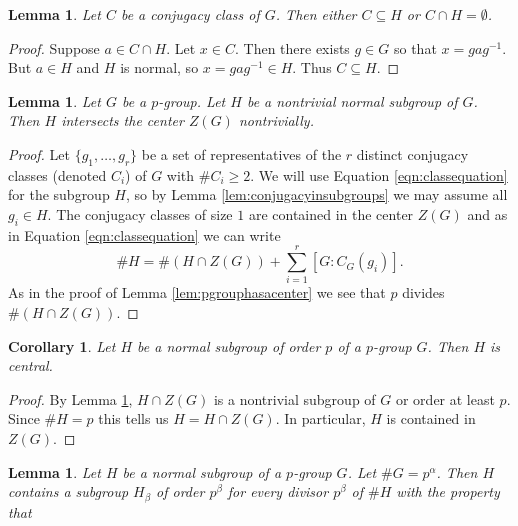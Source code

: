 \documentclass{dcthesis}
\newtheorem{lemma}[prop]{Lemma}
\newtheorem{corr}[prop]{Corollary}
\theoremstyle{definition}
\theoremstyle{remark}
\numberwithin{equation}{section}
\numberwithin{figure}{section}
\begin{document}
{{\begin{lemma}
      Let $C$ be a conjugacy class of $G$.
      Then either $C\subseteq H$ or $C\cap H = \emptyset$.
    \end{lemma}
    \begin{proof}
      Suppose $a\in C\cap H$.
      Let $x\in C$.
      Then there exists $g\in G$ so that
      $x = gag^{-1}$.
      But $a\in H$ and $H$ is normal,
      so $x=gag^{-1}\in H$.
      Thus $C\subseteq H$.
    \end{proof}
    \begin{lemma}
      \label{lem:normalimpliescentralintersect}
      Let $G$ be a $p$-group.
      Let $H$ be a nontrivial normal subgroup of $G$.
      Then $H$ intersects the center $Z(G)$ nontrivially.
    \end{lemma}
    \begin{proof}
      Let $\{g_1,\dots,g_r\}$ be a set of representatives of the
      $r$ distinct conjugacy classes (denoted $C_i$)
      of $G$ with $\#C_i\ge 2$.
      We will use Equation \ref{eqn:classequation}
      for the subgroup $H$, so
      by Lemma \ref{lem:conjugacyinsubgroups}
      we may assume all $g_i\in H$.
      The conjugacy classes of size $1$ are contained in the center $Z(G)$
      and as in Equation \ref{eqn:classequation} we
      can write
      \begin{equation}
        \label{eqn:classequationsubgroup}
        \#H = \#(H\cap Z(G))+
        \sum_{i=1}^r[G:C_G(g_i)].
      \end{equation}
      As in the proof of
      Lemma \ref{lem:pgrouphasacenter}
      we see that $p$ divides $\#(H\cap Z(G))$.
    \end{proof}
    \begin{corr}
      \label{cor:normalcentral}
      Let $H$ be a normal subgroup of order $p$ of a $p$-group $G$.
      Then $H$ is central.
    \end{corr}
    \begin{proof}
      By Lemma \ref{lem:normalimpliescentralintersect},
      $H\cap Z(G)$ is a nontrivial subgroup of $G$
      or order at least $p$.
      Since $\#H=p$ this tells us
      $H=H\cap Z(G)$.
      In particular,
      $H$ is contained in $Z(G)$.
    \end{proof}
    \begin{lemma}
      \label{lem:normalsubgroupsofallorders}
      Let $H$ be a normal subgroup of a $p$-group $G$.
      Let $\#G=p^\alpha$.
      Then $H$ contains a subgroup $H_\beta$ of order $p^\beta$
      for every divisor $p^\beta$ of $\#H$
      with the property that

\end{lemma}}}
\end{document}
